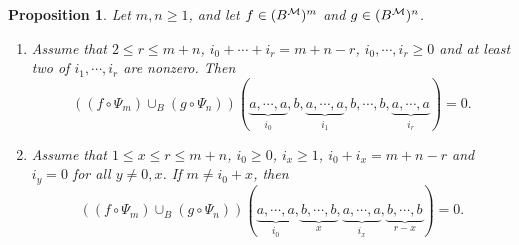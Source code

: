 \documentclass[10pt, reqno]{amsart}
\newtheorem{prop}[theorem]{Proposition}
\theoremstyle{definition}
\theoremstyle{remark}
\numberwithin{equation}{section}
\begin{document}
\begin{prop} \label{prop: cup product be zero}
      Let \(m,n\ge 1\), and let \(f\in (B^{\mathcal{M}})^m\) and \(g\in (B^{\mathcal{M}})^n\).
      \begin{enumerate}
          \item Assume that $2\le r \le m+n$, $i_0+\cdots+i_r=m+n-r$, $i_0,\cdots,i_r\ge0$ and at least two of $i_1,\cdots,i_r$ are nonzero. Then 
      \[ ((f\circ\Psi_m) \cup_B (g\circ\Psi_n))(\underbrace{a,\cdots,a}_{i_0},b,\underbrace{a,\cdots,a}_{i_1},b,\cdots,b,\underbrace{a,\cdots,a}_{i_r})=0.\]
          \item Assume that \(1\le x\le  r \le m+n\), \(i_0\ge 0\), \(i_x\ge 1\), \(i_0+i_x=m+n-r\) and \(i_y=0\) for all \(y\neq 0,x\). If \(m\ne i_0+x\), then
      \[ ((f\circ\Psi_m) \cup_B (g\circ\Psi_n))(\underbrace{a,\cdots,a}_{i_0},\underbrace{b,\cdots,b}_{x},\underbrace{a,\cdots,a}_{i_x},\underbrace{b,\cdots,b}_{r-x})=0.\]
      \end{enumerate}
\end{prop}
\end{document}
